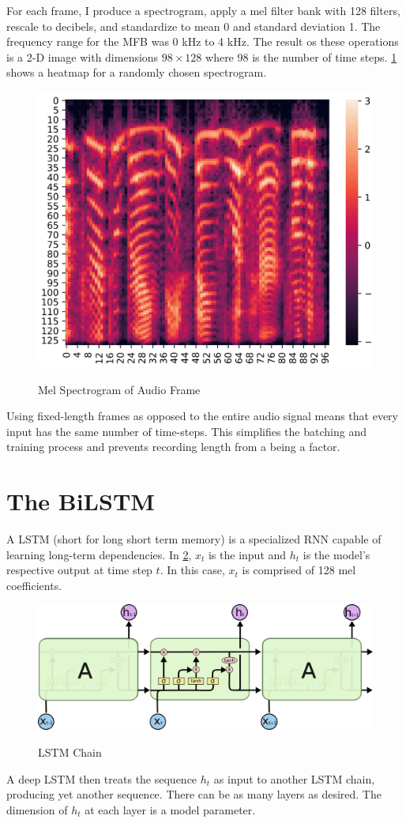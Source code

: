 \documentclass[11pt,a4paper]{article}
\begin{document}
For each frame, I produce a spectrogram, apply a mel filter bank with 128 filters, rescale to decibels, and standardize to mean 0 and standard deviation 1. The frequency range for the MFB was 0 kHz to 4 kHz. The result os these operations is a 2-D image with dimensions \(98 \times 128\) where 98 is the number of time steps. \cref{fig:mel_spec} shows a heatmap for a randomly chosen spectrogram.
\begin{figure}[h]
  \centering
  \caption{Mel Spectrogram of Audio Frame}
  \includegraphics[width=.48\textwidth]{spec.png}
  \label{fig:mel_spec}
\end{figure}

Using fixed-length frames as opposed to the entire audio signal means that every input has the same number of time-steps. This simplifies the batching and training process and prevents recording length from a being a factor.

\section{The BiLSTM} \label{sec:bilstm}

A LSTM (short for long short term memory) is a specialized RNN capable of learning long-term dependencies. In \cref{fig:lstm_chain}, \(x_t\) is the input and \(h_t\) is the model's respective output at time step \(t\). In this case, \(x_t\) is comprised of 128 mel coefficients.
\begin{figure}[h]
  \centering
  \caption{LSTM Chain \citep{olah}}
  \includegraphics[width=.48\textwidth]{lstm.png}
  \label{fig:lstm_chain}
\end{figure}

A deep LSTM then treats the sequence \(h_t\) as input to another LSTM chain, producing yet another sequence. There can be as many layers as desired. The dimension of \(h_t\) at each layer is a model parameter.
\end{document}
